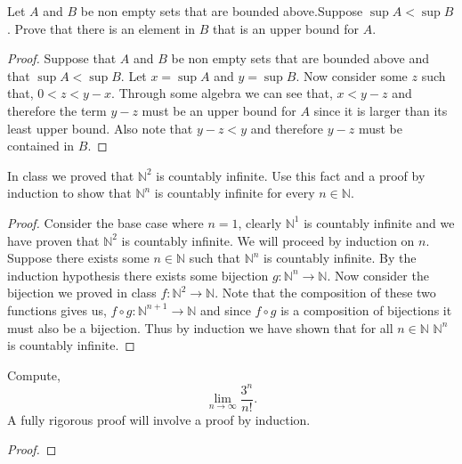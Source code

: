 \documentclass[12pt]{article}
\makeatletter
\theoremstyle{homework}
\newenvironment{exercise}[1]
{\def\@currentlabel{#1}\exercisecore}
{\endexercisecore}
\newcommand{\Nats}{\ensuremath{\mathbb N}}
\makeatother
\begin{document}
\begin{exercise}{1}Let $A$ and $B$ be non empty sets that are bounded above.Suppose $\sup A < \sup B$. Prove that there is an element in $B$ that is an
	upper bound for $A$.\\

	\begin{proof}
		Suppose that $A$ and $B$ be non empty sets that are bounded above and that $\sup A < \sup B$. Let $x = \sup A$ and $y = \sup B$. Now consider some $z$
		such that, $0 < z < y-x$. Through some algebra we can see that, $x < y - z$  and therefore the term $y - z$ must be an upper bound for $A$ since it is larger than its least upper bound. Also 
		note that $y - z < y$ and therefore $y-z$ must be contained in $B$.
	\end{proof}

\end{exercise}


\begin{exercise}{2} In class we proved that $\Nats^2$ is countably infinite. Use this fact and a proof by induction to show that $\Nats^n$ is countably infinite for every $n \in \Nats$. \\

  \begin{proof}
    Consider the base case where $n = 1$, clearly $\Nats^1$ is countably infinite and we have proven that $\Nats^2$ is countably infinite. We will proceed by induction on $n$. 
    Suppose there exists some $n\in \Nats$ such that $\Nats^n$ is countably infinite. By the induction hypothesis there exists some bijection 
     $g: \Nats^n \to \Nats$. Now consider the bijection we proved in class $f: \Nats^2 \to \Nats$. Note that the composition of these two functions gives us, 
     $f\circ g: \Nats^{n+1} \to \Nats $ and since $f\circ g$ is a composition of bijections it must also be a bijection. Thus by induction we have shown that for all $n\in \Nats$
     $\Nats^n$ is countably infinite.     
  \end{proof}
  
\end{exercise}
\vspace{.5in}



\begin{exercise} {3} Compute,
  \begin{equation*}
    \lim_{n \to \infty}\dfrac{3^n}{n!}.
  \end{equation*}
  A fully rigorous proof will involve a proof by induction. \\

\begin{proof}
  
\end{proof}

\end{exercise}
\vspace{.5in}
\end{document}
